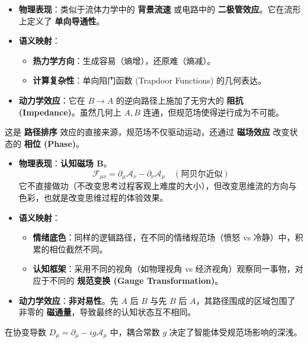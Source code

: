 \begin{itemize}
    \item \textbf{物理表现}：类似于流体力学中的 \textbf{背景流速} 或电路中的 \textbf{二极管效应}。它在流形上定义了 \textbf{单向导通性}。
    \item \textbf{语义映射}：
    \begin{itemize}
        \item \textbf{热力学方向}：生成容易（熵增），还原难（熵减）。
        \item \textbf{计算复杂性}：单向陷门函数 (Trapdoor Functions) 的几何表达。
    \end{itemize}
    \item \textbf{动力学效应}：它在 $B \to A$ 的逆向路径上施加了无穷大的 \textbf{阻抗 (Impedance)}。虽然几何上 $A, B$ 连通，但规范场使得逆行成为不可能。
\end{itemize}


这是 \textbf{路径排序} 效应的直接来源，规范场不仅驱动运动，还通过 \textbf{磁场效应} 改变状态的 \textbf{相位 (Phase)}。

\begin{itemize}
    \item \textbf{物理表现}：\textbf{认知磁场 $\mathbf{B}$}。
    $$ \mathcal{F}_{\mu\nu} = \partial_\mu \mathcal{A}_\nu - \partial_\nu \mathcal{A}_\mu \quad (\text{阿贝尔近似}) $$
    它不直接做功（不改变思考过程客观上难度的大小），但改变思维流的方向与色彩，也就是改变思维过程的体验效果。
    \item \textbf{语义映射}：
    \begin{itemize}
        \item \textbf{情绪底色}：同样的逻辑路径，在不同的情绪规范场（愤怒 vs 冷静）中，积累的相位截然不同。
        \item \textbf{认知框架}：采用不同的视角（如物理视角 vs 经济视角）观察同一事物，对应于不同的 \textbf{规范变换 (Gauge Transformation)}。
    \end{itemize}
    \item \textbf{动力学效应}：\textbf{非对易性}。先 $A$ 后 $B$ 与先 $B$ 后 $A$，其路径围成的区域包围了非零的 \textbf{磁通量}，导致最终的认知状态互不相同。
\end{itemize}


在协变导数 $D_\mu = \partial_\mu - i g \mathcal{A}_\mu$ 中，耦合常数 $g$ 决定了智能体受规范场影响的深浅。

